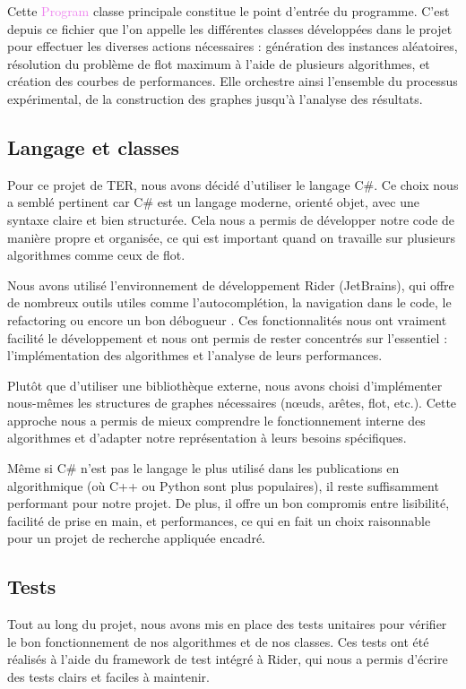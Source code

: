 \documentclass[a4paper]{article}
\begin{document}
Cette \textcolor{violet}{Program} classe principale constitue le point d'entrée du programme. C’est depuis ce fichier que l’on appelle les différentes classes développées dans le projet pour effectuer les diverses actions nécessaires : génération des instances aléatoires, résolution du problème de flot maximum à l’aide de plusieurs algorithmes, et création des courbes de performances. Elle orchestre ainsi l’ensemble du processus expérimental, de la construction des graphes jusqu’à l’analyse des résultats.

\subsection{Langage et classes}

Pour ce projet de TER, nous avons décidé d’utiliser le langage C\#. Ce choix nous a semblé pertinent car C\# est un langage moderne, orienté objet, avec une syntaxe claire et bien structurée. Cela nous a permis de développer notre code de manière propre et organisée, ce qui est important quand on travaille sur plusieurs algorithmes comme ceux de flot.

Nous avons utilisé l’environnement de développement Rider (JetBrains), qui offre de nombreux outils utiles comme l’autocomplétion, la navigation dans le code, le refactoring ou encore un bon débogueur \cite{jetbrains_rider}. Ces fonctionnalités nous ont vraiment facilité le développement et nous ont permis de rester concentrés sur l’essentiel : l’implémentation des algorithmes et l’analyse de leurs performances.

Plutôt que d’utiliser une bibliothèque externe, nous avons choisi d’implémenter nous-mêmes les structures de graphes nécessaires (nœuds, arêtes, flot, etc.). Cette approche nous a permis de mieux comprendre le fonctionnement interne des algorithmes et d’adapter notre représentation à leurs besoins spécifiques.

Même si C\# n’est pas le langage le plus utilisé dans les publications en algorithmique (où C++ ou Python sont plus populaires), il reste suffisamment performant pour notre projet. De plus, il offre un bon compromis entre lisibilité, facilité de prise en main, et performances, ce qui en fait un choix raisonnable pour un projet de recherche appliquée encadré.
\subsection{Tests}
Tout au long du projet, nous avons mis en place des tests unitaires pour vérifier le bon fonctionnement de nos algorithmes et de nos classes. Ces tests ont été réalisés à l'aide du framework de test intégré à Rider, qui nous a permis d'écrire des tests clairs et faciles à maintenir.
\end{document}
